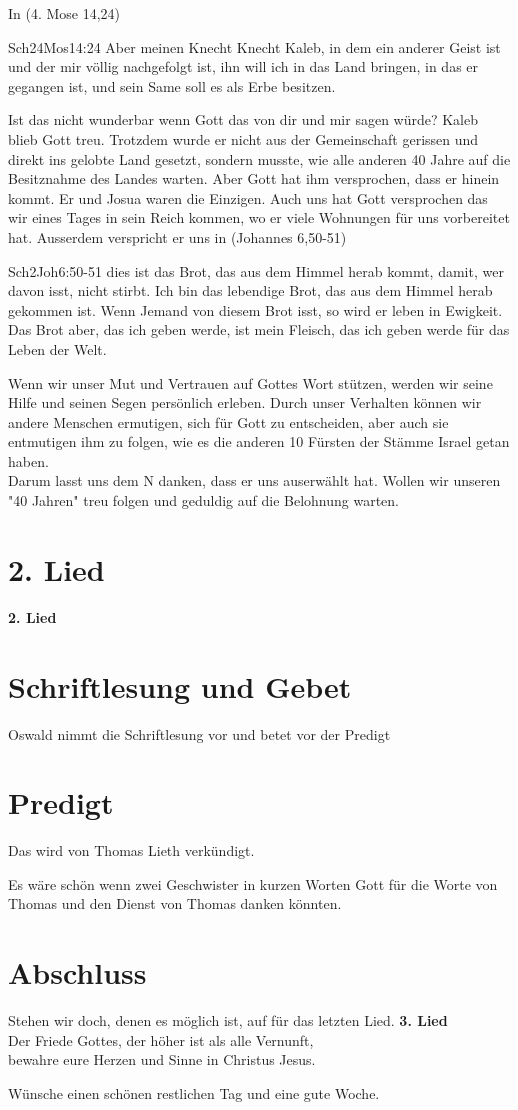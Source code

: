 \documentclass[12pt,a4paper]{scrarticle}
\begin{document}
In (4. Mose 14,24)
\begin{bibeltext}{Sch2}{4Mos}{14:24}
Aber meinen Knecht Knecht Kaleb, in dem ein anderer Geist ist und der mir völlig nachgefolgt ist, ihn will ich in das Land bringen, in das er gegangen ist, und sein Same soll es als Erbe besitzen.
\end{bibeltext}
Ist das nicht wunderbar wenn Gott das von dir und mir sagen würde? Kaleb blieb Gott treu. Trotzdem wurde er nicht aus der Gemeinschaft gerissen und direkt ins gelobte Land gesetzt, sondern musste, wie alle anderen 40 Jahre auf die Besitznahme des Landes warten. Aber Gott hat ihm versprochen, dass er hinein kommt. Er und Josua waren die Einzigen. 
Auch uns hat Gott versprochen das wir eines Tages in sein Reich kommen, wo er viele Wohnungen für uns vorbereitet hat. Ausserdem verspricht er uns in (Johannes 6,50-51)
\begin{bibeltext}{Sch2}{Joh}{6:50-51}
dies ist das Brot, das aus dem Himmel herab kommt, damit, wer davon isst, nicht stirbt. Ich bin das lebendige Brot, das aus dem Himmel herab gekommen ist. Wenn Jemand von diesem Brot isst, so wird er leben in Ewigkeit. Das Brot aber, das ich geben werde, ist mein Fleisch, das ich geben werde für das Leben der Welt.
\end{bibeltext}
Wenn wir unser Mut und Vertrauen auf Gottes Wort stützen, werden wir seine Hilfe und seinen Segen persönlich erleben. Durch unser Verhalten können wir andere Menschen ermutigen, sich für Gott zu entscheiden, aber auch sie entmutigen ihm zu folgen, wie es die anderen 10 Fürsten der Stämme Israel getan haben.\\
Darum lasst uns dem \herr N danken, dass er uns auserwählt hat. Wollen wir unseren "40 Jahren" treu folgen und geduldig auf die Belohnung warten.

\section{2. Lied}

\textbf{2. Lied}

\section{Schriftlesung und Gebet}
Oswald nimmt die Schriftlesung vor und betet vor der Predigt

\section{Predigt}
Das wird von Thomas Lieth verkündigt.

Es wäre schön wenn zwei Geschwister in kurzen Worten Gott für die Worte von Thomas und den Dienst von Thomas danken könnten.

\section{Abschluss}
Stehen wir doch, denen es möglich ist, auf für das letzten Lied.
\textbf{3. Lied}
\\
Der Friede Gottes, der höher ist als alle Vernunft,\\
bewahre eure Herzen und Sinne in Christus Jesus.

Wünsche einen schönen restlichen Tag und eine gute Woche.
\end{document}
